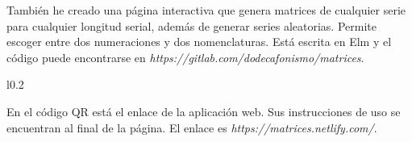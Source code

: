		
		\bigbreak
		
		También he creado una página interactiva que genera matrices de cualquier serie para cualquier longitud serial, además de generar series aleatorias. Permite escoger entre dos numeraciones y dos nomenclaturas. Está escrita en Elm y el código puede encontrarse en \textit{https://gitlab.com/dodecafonismo/matrices}.
		
		\begin{wrapfigure}{l}{0.2\textwidth}
			\vspace{-\bigskipamount}
		\end{wrapfigure} En el código QR está el enlace de la aplicación web. Sus instrucciones de uso se encuentran al final de la página. El enlace es \textit{https://matrices.netlify.com/}.
		